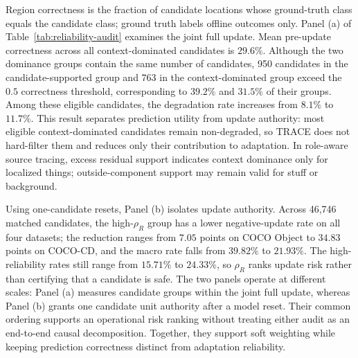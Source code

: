\documentclass[letterpaper]{article}
\newcommand{\method}{TRACE\xspace}
\begin{document}
	Region correctness is the fraction of candidate locations whose ground-truth class equals the candidate class; ground truth labels offline outcomes only. Panel (a) of Table~\ref{tab:reliability-audit} examines the joint full update. Mean pre-update correctness across all context-dominated candidates is $29.6\%$. Although the two dominance groups contain the same number of candidates, 950 candidates in the candidate-supported group and 763 in the context-dominated group exceed the $0.5$ correctness threshold, corresponding to $39.2\%$ and $31.5\%$ of their groups. Among these eligible candidates, the degradation rate increases from $8.1\%$ to $11.7\%$. This result separates prediction utility from update authority: most eligible context-dominated candidates remain non-degraded, so \method does not hard-filter them and reduces only their contribution to adaptation. In role-aware source tracing, excess residual support indicates context dominance only for localized things; outside-component support may remain valid for stuff or background.
	
	Using one-candidate resets, Panel (b) isolates update authority. Across 46,746 matched candidates, the high-$\rho_R$ group has a lower negative-update rate on all four datasets; the reduction ranges from $7.05$ points on COCO Object to $34.83$ points on COCO-CD, and the macro rate falls from $39.82\%$ to $21.93\%$. The high-reliability rates still range from $15.71\%$ to $24.33\%$, so $\rho_R$ ranks update risk rather than certifying that a candidate is safe. The two panels operate at different scales: Panel (a) measures candidate groups within the joint full update, whereas Panel (b) grants one candidate unit authority after a model reset. Their common ordering supports an operational risk ranking without treating either audit as an end-to-end causal decomposition. Together, they support soft weighting while keeping prediction correctness distinct from adaptation reliability.
	
\end{document}
